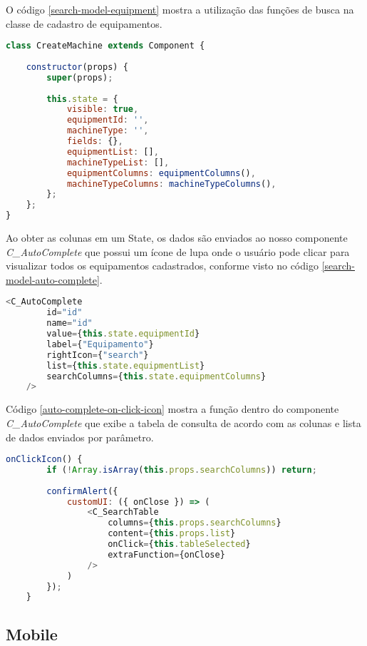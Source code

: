 O código \ref{search-model-equipment} mostra a utilização das funções de busca na classe de cadastro de equipamentos.

\begin{lstlisting}[language=JavaScript, caption={Tela para cadastro de equipamento}, label={search-model-equipment}]
class CreateMachine extends Component {
	
	constructor(props) {
		super(props);
		
		this.state = {
			visible: true,
			equipmentId: '',
			machineType: '',
			fields: {},
			equipmentList: [],
			machineTypeList: [],
			equipmentColumns: equipmentColumns(),
			machineTypeColumns: machineTypeColumns(),
		};
	};
}
\end{lstlisting}

Ao obter as colunas em um State, os dados são enviados ao nosso componente \textit{C{\_}AutoComplete} que possui um ícone de lupa onde o usuário pode clicar para visualizar todos os equipamentos cadastrados, conforme visto no código \ref{search-model-auto-complete}.

\begin{lstlisting}[language=JavaScript, caption={Utilizando o componente C\_AutoComplete}, label={search-model-auto-complete}]
	<C_AutoComplete
		id="id"
		name="id"
		value={this.state.equipmentId}
		label={"Equipamento"}
		rightIcon={"search"}
		list={this.state.equipmentList}
		searchColumns={this.state.equipmentColumns}
	/>
\end{lstlisting}

Código \ref{auto-complete-on-click-icon} mostra a função dentro do componente \textit{C{\_}AutoComplete} que exibe a tabela de consulta de acordo com as colunas e lista de dados enviados por parâmetro.

\begin{lstlisting}[language=JavaScript, caption={Componente C\_AutoComplete: Função executada ao clicar na lupa}, label={auto-complete-on-click-icon}]
	onClickIcon() {
		if (!Array.isArray(this.props.searchColumns)) return;
		
		confirmAlert({
			customUI: ({ onClose }) => (
				<C_SearchTable
					columns={this.props.searchColumns}
					content={this.props.list}
					onClick={this.tableSelected}
					extraFunction={onClose}
				/>
			)
		});
	}
\end{lstlisting}

\subsection{Mobile}
